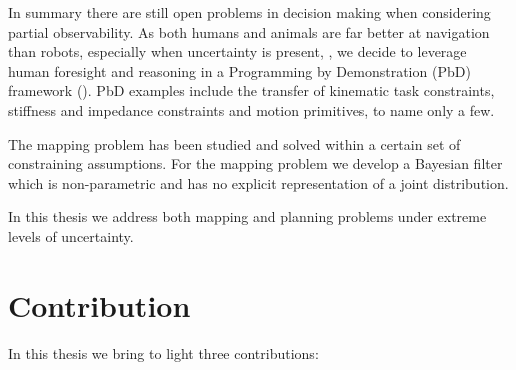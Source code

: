 
In summary there are still open problems in decision making when considering partial observability.
As both humans and animals are far better at navigation than robots, especially when uncertainty is present, \cite{stankiewicz2006lost},
we decide to leverage human foresight and reasoning in a Programming by Demonstration (PbD) framework (\cite{Billard08chapter}). 
PbD examples include the transfer of kinematic task constraints, stiffness and impedance constraints and motion primitives, to name only a few.

The mapping problem has been studied and solved within a certain set of constraining assumptions. For the mapping problem we
develop a Bayesian filter which is non-parametric and has no explicit representation of a joint distribution.

In this thesis we address both mapping and planning problems under extreme levels of uncertainty. 



\section{Contribution}
%	
%

In this thesis we bring to light three contributions:


